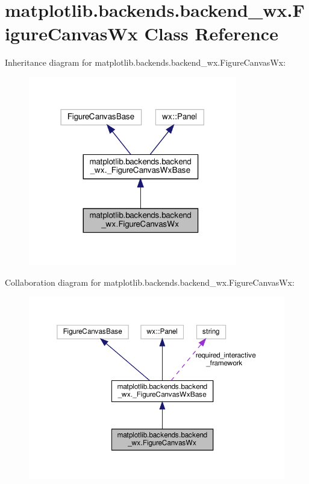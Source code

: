 \hypertarget{classmatplotlib_1_1backends_1_1backend__wx_1_1FigureCanvasWx}{}\section{matplotlib.\+backends.\+backend\+\_\+wx.\+Figure\+Canvas\+Wx Class Reference}
\label{classmatplotlib_1_1backends_1_1backend__wx_1_1FigureCanvasWx}


Inheritance diagram for matplotlib.\+backends.\+backend\+\_\+wx.\+Figure\+Canvas\+Wx\+:
\nopagebreak
\begin{figure}[H]
\begin{center}
\leavevmode
\includegraphics[width=258pt]{classmatplotlib_1_1backends_1_1backend__wx_1_1FigureCanvasWx__inherit__graph}
\end{center}
\end{figure}


Collaboration diagram for matplotlib.\+backends.\+backend\+\_\+wx.\+Figure\+Canvas\+Wx\+:
\nopagebreak
\begin{figure}[H]
\begin{center}
\leavevmode
\includegraphics[width=350pt]{classmatplotlib_1_1backends_1_1backend__wx_1_1FigureCanvasWx__coll__graph}
\end{center}
\end{figure}
